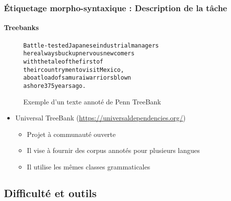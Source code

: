\documentclass[xcolor=table]{beamer}
\begin{document}
\begin{frame}[fragile]
\frametitle{Étiquetage morpho-syntaxique : Description de la tâche}
\framesubtitle{Treebanks}


\begin{figure}
	\begin{tcolorbox}
		\small
\begin{alltt}
Battle-tested Japanese industrial managers
here always buck up nervous newcomers
with the tale of the first of
their countrymen to visit Mexico ,\keyword{/,}
a boatload of samurai warriors blown
ashore 375 years ago .
\end{alltt}
\end{tcolorbox}
\caption{Exemple d'un texte annoté de Penn TreeBank \cite{2003-taylor}}
\end{figure}

\begin{itemize}
	\item Universal TreeBank (\url{https://universaldependencies.org/}) \cite{2012-petrov-al}
	\begin{itemize}
		\item Projet à communauté ouverte
		\item Il vise à fournir des corpus annotés pour plusieurs langues
		\item Il utilise les mêmes classes grammaticales
	\end{itemize}
\end{itemize}

\end{frame}

\subsection{Difficulté et outils}
\end{document}
